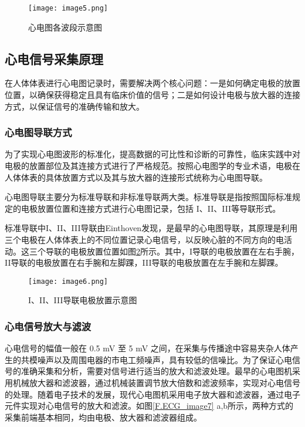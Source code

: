 \begin{figure}[hbt]
    \centering
    \texttt{[image: image5.png]}
    \caption{心电图各波段示意图\cite{现代医学电子仪器原理与设计}}
    \label{F.ECG_image5}
\end{figure}

\subsection{心电信号采集原理}
在人体体表进行心电图记录时，需要解决两个核心问题：一是如何确定电极的放置位置，以确保获得稳定且具有临床价值的信号；二是如何设计电极与放大器的连接方式，以保证信号的准确传输和放大。

\subsubsection{心电图导联方式}

为了实现心电图波形的标准化，提高数据的可比性和诊断的可靠性，临床实践中对电极的放置部位及其连接方式进行了严格规范。按照心电图学的专业术语，电极在人体体表的具体放置方式以及其与放大器的连接形式统称为心电图导联。

心电图导联主要分为标准导联和非标准导联两大类。标准导联是指按照国际标准规定的电极放置位置和连接方式进行心电图记录，包括 I、II、III等导联形式。

标准导联中I、II、III导联由Einthoven发现，是最早的心电图导联，其原理是利用三个电极在人体体表上的不同位置记录心电信号，以反映心脏的不同方向的电活动。这三个导联的电极放置位置如图\ref{F.ECG_image6}所示。其中，I导联的电极放置在左右手腕，II导联的电极放置在右手腕和左脚踝，III导联的电极放置在左手腕和左脚踝。

\begin{figure}[hbt]
    \centering
    \texttt{[image: image6.png]}
    \caption{I、II、III导联电极放置示意图\cite{现代医学电子仪器原理与设计}}
    \label{F.ECG_image6}
\end{figure}

\subsubsection{心电信号放大与滤波}

心电信号的幅值一般在 0.5 mV 至 5 mV 之间，在采集与传播途中容易夹杂人体产生的共模噪声以及周围电器的市电工频噪声，具有较低的信噪比。为了保证心电信号的准确采集和分析，需要对信号进行适当的放大和滤波处理。最早的心电图机采用机械放大器和滤波器，通过机械装置调节放大倍数和滤波频率，实现对心电信号的处理。随着电子技术的发展，现代心电图机采用电子放大器和滤波器，通过电子元件实现对心电信号的放大和滤波。如图\ref{F.ECG_image7} a,b所示，两种方式的采集前端基本相同，均由电极、放大器和滤波器组成。

